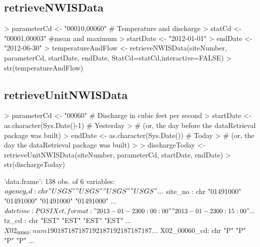 \documentclass[a4paper,11pt]{article}
\begin{document}
\subsection{retrieveNWISData}
\begin{Schunk}
\begin{Sinput}
> parameterCd <- "00010,00060"  # Temperature and discharge
> statCd <- "00001,00003"  #mean and maximum
> startDate <- "2012-01-01"
> endDate <- "2012-06-30"
> temperatureAndFlow <- retrieveNWISData(siteNumber, parameterCd, 
        startDate, endDate, StatCd=statCd,interactive=FALSE)
> str(temperatureAndFlow)
\end{Sinput}
\end{Schunk}

\subsection{retrieveUnitNWISData}
\begin{Schunk}
\begin{Sinput}
> parameterCd <- "00060"  # Discharge in cubic feet per second
> startDate <- as.character(Sys.Date()-1) # Yesterday 
>   # (or, the day before the dataRetrieval package was built)
> endDate <- as.character(Sys.Date()) # Today 
>   # (or, the day the dataRetrieval package was built)
> 
> dischargeToday <- retrieveUnitNWISData(siteNumber, parameterCd, startDate, endDate)
> str(dischargeToday)
\end{Sinput}
\begin{Soutput}
'data.frame':	138 obs. of  6 variables:
 $ agency_cd   : chr  "USGS" "USGS" "USGS" "USGS" ...
 $ site_no     : chr  "01491000" "01491000" "01491000" "01491000" ...
 $ datetime    : POSIXct, format: "2013-01-23 00:00:00" "2013-01-23 00:15:00" ...
 $ tz_cd       : chr  "EST" "EST" "EST" "EST" ...
 $ X02_00060   : num  190 187 187 187 192 187 192 187 187 187 ...
 $ X02_00060_cd: chr  "P" "P" "P" "P" ...
\end{Soutput}
\end{Schunk}
\end{document}
